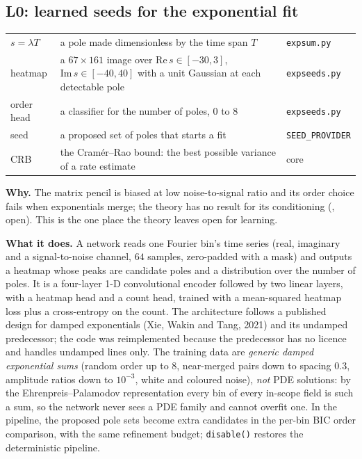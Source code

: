 \subsection{L0: learned seeds for the exponential fit}\label{sec:l0}
\begin{symbols}
\begin{tabular}{@{}L{2.6cm}L{6.0cm}L{4.3cm}@{}}
$s=\lambda T$ & a pole made dimensionless by the time span $T$ & \texttt{expsum.py}\\
heatmap & a $67\times161$ image over $\mathrm{Re}\,s\in[-30,3]$, $\mathrm{Im}\,s\in[-40,40]$ with a unit Gaussian at each detectable pole & \texttt{expseeds.py}\\
order head & a classifier for the number of poles, $0$ to $8$ & \texttt{expseeds.py}\\
seed & a proposed set of poles that starts a fit & \texttt{SEED\_PROVIDER}\\
CRB & the Cram\'er--Rao bound: the best possible variance of a rate estimate & core\\
\end{tabular}
\end{symbols}
\textbf{Why.} The matrix pencil is biased at low noise-to-signal ratio and its order choice fails when exponentials merge; the theory has no result for its conditioning (, open). This is the one place the theory leaves open for learning.

\textbf{What it does.} A network reads one Fourier bin's time series (real, imaginary and a signal-to-noise channel, $64$ samples, zero-padded with a mask) and outputs a heatmap whose peaks are candidate poles and a distribution over the number of poles. It is a four-layer 1-D convolutional encoder followed by two linear layers, with a heatmap head and a count head, trained with a mean-squared heatmap loss plus a cross-entropy on the count. The architecture follows a published design for damped exponentials (Xie, Wakin and Tang, 2021) and its undamped predecessor; the code was reimplemented because the predecessor has no licence and handles undamped lines only. The training data are \emph{generic damped exponential sums} (random order up to $8$, near-merged pairs down to spacing $0.3$, amplitude ratios down to $10^{-3}$, white and coloured noise), \emph{not} PDE solutions: by the Ehrenpreis--Palamodov representation every bin of every in-scope field is such a sum, so the network never sees a PDE family and cannot overfit one. In the pipeline, the proposed pole sets become extra candidates in the per-bin BIC order comparison, with the same refinement budget; \texttt{disable()} restores the deterministic pipeline.

